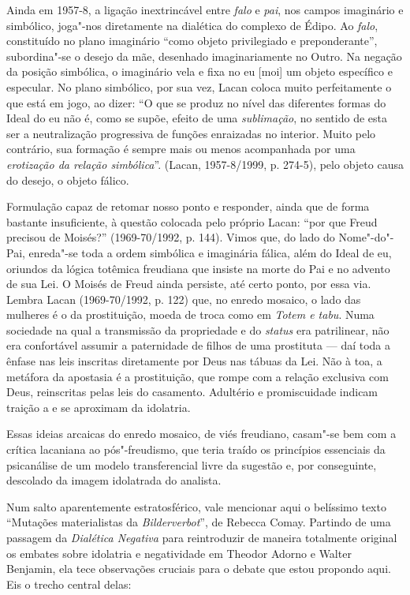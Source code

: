 Ainda em 1957-8, a ligação inextrincável entre \emph{falo} e \emph{pai},
nos campos imaginário e simbólico, joga"-nos diretamente na
dialética do complexo de Édipo. Ao \emph{falo}, constituído no plano
imaginário ``como objeto privilegiado e preponderante'', subordina"-se o
desejo da mãe, desenhado imaginariamente no Outro. Na negação da posição
simbólica, o imaginário vela e fixa no eu {[}moi{]} um objeto específico
e especular. No plano simbólico, por sua vez, Lacan coloca muito
perfeitamente o que está em jogo, ao dizer: ``O que se produz no nível
das diferentes formas do Ideal do eu não é, como se supõe, efeito de uma
\emph{sublimação}, no sentido de esta ser a neutralização progressiva de
funções enraizadas no interior. Muito pelo contrário, sua formação é
sempre mais ou menos acompanhada por uma \emph{erotização da relação
simbólica}''. (Lacan, 1957-8/1999, p. 274-5), pelo objeto causa do
desejo, o objeto fálico.

Formulação capaz de retomar nosso ponto e responder, ainda que de forma
bastante insuficiente, à questão colocada pelo próprio Lacan: ``por que
Freud precisou de Moisés?'' (1969-70/1992, p. 144). Vimos que, do lado
do Nome"-do"-Pai, enreda"-se toda a ordem simbólica e imaginária fálica,
além do Ideal de eu, oriundos da lógica totêmica freudiana que insiste
na morte do Pai e no advento de sua Lei. O Moisés de Freud ainda
persiste, até certo ponto, por essa via. Lembra Lacan (1969-70/1992, p.
122) que, no enredo mosaico, o lado das mulheres é o da prostituição,
moeda de troca como em \emph{Totem e tabu}. Numa sociedade na qual a
transmissão da propriedade e do \emph{status} era patrilinear, não era
confortável assumir a paternidade de filhos de uma prostituta --- daí
toda a ênfase nas leis inscritas diretamente por Deus nas tábuas da Lei.
Não à toa, a metáfora da apostasia é a prostituição, que rompe com a
relação exclusiva com Deus, reinscritas pelas leis do casamento.
Adultério e promiscuidade indicam traição a  e se aproximam da
idolatria.

Essas ideias arcaicas do enredo mosaico, de viés freudiano, casam"-se bem
com a crítica lacaniana ao pós"-freudismo, que teria traído os princípios
essenciais da psicanálise de um modelo transferencial livre da sugestão
e, por conseguinte, descolado da imagem idolatrada do analista.

Num salto aparentemente estratosférico, vale mencionar aqui o belíssimo
texto ``Mutações materialistas da \emph{Bilderverbot}'', de Rebecca
Comay. Partindo de uma passagem da \emph{Dialética Negativa} para
reintroduzir de maneira totalmente original os embates sobre idolatria e
negatividade em Theodor Adorno e Walter Benjamin, ela tece observações
cruciais para o debate que estou propondo aqui. Eis o trecho central
delas:


